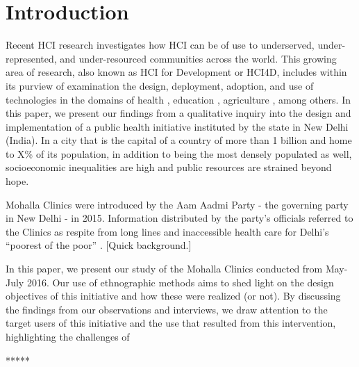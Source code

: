 \section{Introduction}

\begin{comment}
High level overview of the phenomenon you are studying. Should be something the reader can immediately get behind and hook themselves to. 
Now carry the reader through your flow. Draw their focus to the more narrow context in which you did your work.  
“In this paper, we focus on…” Give the high level description of your research.
“This paper is structured as follows.” Give the outline. When you mention the discussion, also mention the main findings of the discussion.
\end{comment}

\textcolor{red}{}

Recent HCI research investigates how HCI can be of use to underserved, under-represented, and under-resourced communities across the world. This growing area of research, also known as HCI for Development or HCI4D, includes within its purview of examination the design, deployment, adoption, and use of technologies in the domains of health \cite{PH-CHI;TP}, education \cite{Kam}, agriculture \cite{Patel}, among others. In this paper, we present our findings from a qualitative inquiry into the design and implementation of a public health initiative instituted by the state in New Delhi (India). In a city that is the capital of a country of more than 1 billion and home to X\% of its population, in addition to being the most densely populated as well, socioeconomic inequalities are high and public resources are strained beyond hope. 

Mohalla Clinics were introduced by the Aam Aadmi Party - the governing party in New Delhi - in 2015. Information distributed by the party's officials referred to the Clinics as respite from long lines and inaccessible health care for Delhi's ``poorest of the poor'' \cite{}. [Quick background.]

In this paper, we present our study of the Mohalla Clinics conducted from May-July 2016. Our use of ethnographic methods aims to shed light on the design objectives of this initiative and how these were realized (or not). By discussing the findings from our observations and interviews, we draw attention to the target users of this initiative and the use that resulted from this intervention, highlighting the challenges of 

*****

